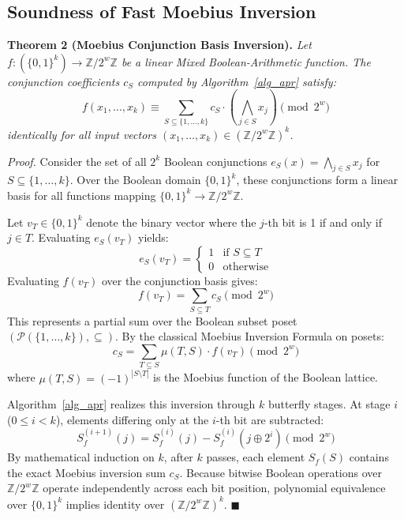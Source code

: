 \documentclass[11pt,a4paper]{article}
\begin{document}
\subsection{Soundness of Fast Moebius Inversion}
\label{thm_moebius}

\textbf{Theorem 2 (Moebius Conjunction Basis Inversion).}
\textit{Let $f: (\{0, 1\}^k) \rightarrow \mathbb{Z}/2^w\mathbb{Z}$ be a linear Mixed Boolean-Arithmetic function. The conjunction coefficients $c_S$ computed by Algorithm~\ref{alg_apr} satisfy:}
\begin{equation}
f(x_1, \dots, x_k) \equiv \sum_{S \subseteq \{1, \dots, k\}} c_S \cdot \left(\bigwedge_{j \in S} x_j\right) \pmod{2^w}
\end{equation}
\textit{identically for all input vectors $(x_1, \dots, x_k) \in (\mathbb{Z}/2^w\mathbb{Z})^k$.}

\textit{Proof.}
Consider the set of all $2^k$ Boolean conjunctions $e_S(x) = \bigwedge_{j \in S} x_j$ for $S \subseteq \{1, \dots, k\}$. Over the Boolean domain $\{0, 1\}^k$, these conjunctions form a linear basis for all functions mapping $\{0, 1\}^k \rightarrow \mathbb{Z}/2^w\mathbb{Z}$.

Let $v_T \in \{0, 1\}^k$ denote the binary vector where the $j$-th bit is 1 if and only if $j \in T$. Evaluating $e_S(v_T)$ yields:
\begin{equation}
e_S(v_T) = \begin{cases} 1 & \text{if } S \subseteq T \\ 0 & \text{otherwise} \end{cases}
\end{equation}
Evaluating $f(v_T)$ over the conjunction basis gives:
\begin{equation}
f(v_T) = \sum_{S \subseteq T} c_S \pmod{2^w}
\end{equation}
This represents a partial sum over the Boolean subset poset $(\mathcal{P}(\{1, \dots, k\}), \subseteq)$. By the classical Moebius Inversion Formula on posets:
\begin{equation}
c_S = \sum_{T \subseteq S} \mu(T, S) \cdot f(v_T) \pmod{2^w}
\end{equation}
where $\mu(T, S) = (-1)^{|S \setminus T|}$ is the Moebius function of the Boolean lattice.

Algorithm~\ref{alg_apr} realizes this inversion through $k$ butterfly stages. At stage $i$ ($0 \le i < k$), elements differing only at the $i$-th bit are subtracted:
\begin{equation}
S_f^{(i+1)}(j) = S_f^{(i)}(j) - S_f^{(i)}(j \oplus 2^i) \pmod{2^w}
\end{equation}
By mathematical induction on $k$, after $k$ passes, each element $S_f(S)$ contains the exact Moebius inversion sum $c_S$. Because bitwise Boolean operations over $\mathbb{Z}/2^w\mathbb{Z}$ operate independently across each bit position, polynomial equivalence over $\{0, 1\}^k$ implies identity over $(\mathbb{Z}/2^w\mathbb{Z})^k$. \hfill $\blacksquare$
\end{document}
